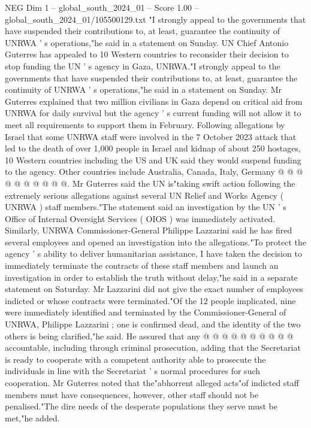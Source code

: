 \begin{textsample}{NEG Dim 1 – global\_south\_2024\_01 – Score 1.00 – global\_south\_2024\_01/105500129.txt}  \label{ex:f1_neg_347}
"I strongly appeal to the governments that have suspended their contributions to, at least, guarantee the continuity of UNRWA ' s operations,"he said in a statement on Sunday.
UN Chief Antonio Guterres has appealed to 10 Western countries to reconsider their decision to stop funding the UN ' s agency in Gaza, UNRWA."I strongly appeal to the governments that have suspended their contributions to, at least, guarantee the continuity of UNRWA ' s operations,"he said in a statement on Sunday.
Mr Guterres explained that two million civilians in Gaza depend on critical aid from UNRWA for daily survival but the agency ' s current funding will not allow it to meet all requirements to support them in February.
Following allegations by Israel that some UNRWA staff were involved in the 7 October 2023 attack that led to the death of over 1,000 people in Israel and kidnap of about 250 hostages, 10 Western countries including the US and UK said they would suspend funding to the agency.
Other countries include Australia, Canada, Italy, Germany @ @ @ @ @ @ @ @ @ @.
Mr Guterres said the UN is"taking swift action following the extremely serious allegations against several UN Relief and Works Agency ( UNRWA ) staff members."The statement said an investigation by the UN ' s Office of Internal Oversight Services ( OIOS ) was immediately activated.
Similarly, UNRWA Commissioner-General Philippe Lazzarini said he has fired several employees and opened an investigation into the allegations."To protect the agency ' s ability to deliver humanitarian assistance, I have taken the decision to immediately terminate the contracts of these staff members and launch an investigation in order to establish the truth without delay,"he said in a separate statement on Saturday.
Mr Lazzarini did not give the exact number of employees indicted or whose contracts were terminated."Of the 12 people implicated, nine were immediately identified and terminated by the Commissioner-General of UNRWA, Philippe Lazzarini ; one is confirmed dead, and the identity of the two others is being clarified,"he said.
He assured that any @ @ @ @ @ @ @ @ @ @ accountable, including through criminal prosecution, adding that the Secretariat is ready to cooperate with a competent authority able to prosecute the individuals in line with the Secretariat ' s normal procedures for such cooperation.
Mr Guterres noted that the"abhorrent alleged acts"of indicted staff members must have consequences, however, other staff should not be penalised."The dire needs of the desperate populations they serve must be met,"he added.

\end{textsample}

